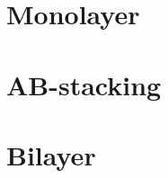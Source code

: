 \documentclass[a4paper,12pt]{report}
\begin{document}
\chapter{Monolayer}


\pagebreak

\chapter{AB-stacking}


\pagebreak

\chapter{Bilayer}


\pagebreak


%


\end{document}
